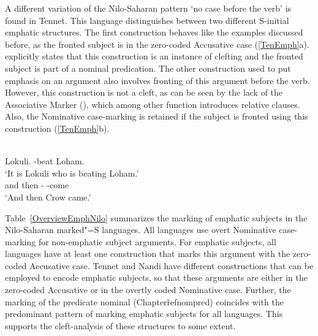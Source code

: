 A different variation of the Nilo-Saharan pattern `no case before the verb' is found in Tennet.
This language distinguishes between two different S-initial emphatic structures. 
The first construction behaves like  the examples discussed before, as the fronted subject is in the zero-coded Accusative case (\ref{TenEmph}a).
\citet{Randal:1998} explicitly states that this construction is an instance of clefting and the fronted subject is part of a nominal predication.
The other construction used to put emphasis on an argument also involves fronting of this argument before the verb. 
However, this construction is not a cleft, as can be seen by the lack of the Associative Marker (\am{}), which among other function introduces relative clauses. 
Also, the Nominative  case-marking is retained if the subject is fronted using this construction (\ref{TenEmph}b).

\enlargethispage{\baselineskip}
\begin{exe}\ex\label{TenEmph}
\begin{xlist}
\ex\gll{}   \\
Lokuli.\acc{} \am{} \ipfv{}-beat Loham.\acc{}\\
\glt `It is Lokuli who is beating Loham.' 
\ex\gll{}   \\
and then \propnoun-\nom{} \ipfv{}-come\\
\glt `And then Crow came.' 
\end{xlist}
\end{exe}

Table~\ref{OverviewEmphNilo} summarizes the marking of emphatic subjects in the Nilo-Saharan marked"=S languages.
All languages use overt Nominative case-marking for non-emphatic subject arguments.
For emphatic subjects, all languages have at least one construction that marks this argument with the zero-coded Accusative case.
Tennet and Nandi have different constructions that can be employed to encode emphatic subjects, so that these arguments are either in the zero-coded Accusative or in the overtly coded Nominative case. 
Further, the marking of the predicate nominal (Chapter\~ref{nompred}) coincides with the predominant pattern of marking emphatic subjects for all languages. This supports the cleft-analysis of these structures to some extent.  


